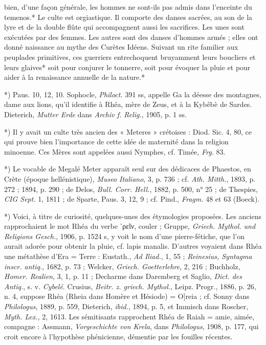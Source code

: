 \documentclass[a4paper, 11pt, oneside, polutonikogreek, french]{article}
\begin{document}
bien, d'une façon générale, les hommes ne sont-ils pas admis dans l'enceinte du temenos.* Le culte est orgiastique. Il comporte des danses sacrées, au son de la lyre et de la double flûte qui accompagnent aussi les sacrifices. Les unes sont exécutées par des femmes. Les autres sont des danses d'hommes armés ; elles ont donné naissance au mythe des Curètes Idéens. Suivant un rite familier aux peuplades primitives, ces guerriers entrechoquent bruyamment leurs boucliers et leurs glaives* soit pour conjurer le tonnerre, soit pour évoquer la pluie et pour aider à la renaissance annuelle de la nature.*

*) Paus. 10, 12, 10. Sophocle, \emph{Philoct.} 391 ss, appelle Ga la déesse des montagnes, dame aux lions, qu'il identifie à Rhéa, mère de Zeus, et à la Kybêbè de Sardes. Dieterich, \emph{Mutter Erde} dans \emph{Archiv f. Relig.}, 1905, p. 1 ss.

*) Il y avait un culte très ancien des « Meteres » crétoises : Diod. Sic. 4, 80, ce qui prouve bien l'importance de cette idée de maternité dans la religion minoenne. Ces Mères sont appelées aussi Nymphes, cf. Timée, \emph{Frg.} 83.

*) Le vocable de Megalé Meter apparaît seul sur des dédicaces de Phaestos, en Crète (époque hellénistique), \emph{Museo Italiano}, 3, p. 736 ; cf. \emph{Ath. Mitth.}, 1893, p. 272 ; 1894, p. 290 ; de Delos, \emph{Bull. Corr. Hell.}, 1882, p. 500, n° 25 ; de Thespies, \emph{CIG Sept.} 1, 1811 ; de Sparte, Paus. 3, 12, 9 ; cf. Pind., \emph{Fragm.} 48 et 63 (Boeck).

*) Voici, à titre de curiosité, quelques-unes des étymologies proposées. Les anciens rapprochaient le mot Rhéa du verbe ῾ρεῖν, couler ; Gruppe, \emph{Griech. Mythol. und Religions Gesch.}, 1906, p. 1524 s, y voit le nom d'une pierre-fétiche, que l'on aurait adorée pour obtenir la pluie, cf. lapis manalis. D'autres voyaient dans Rhéa une métathèse d'Era = Terre : Eustath., \emph{Ad Iliad.}, 1, 55 ; \emph{Reinesius, Syntagma inscr. antiq.}, 1682, p. 73 ; Welcker, \emph{Griech. Goetterlehre}, 2, 216 ; Buchholz, \emph{Homer. Realien}, 3, 1, p. 11 ; Decharme dans Daremberg et Saglio, \emph{Dict. des Antiq.}, s. v. \emph{Cybelé}. Crusius, \emph{Beitr. z. griech. Mythol.}, Leipz. Progr., 1886, p. 26, n. 4, suppose Rhéa (Rheia dans Homère et Hésiode) = O]reia ; cf. Sonny dans \emph{Philologus}, 1889, p. 559, Dieterich, \emph{ibid.}, 1894, p. 5, et Immisch dans Roscher, \emph{Myth. Lex.}, 2, 1613. Les sémitisants rapprochent Rhéa de Raiah = amie, aimée, compagne : Assmann, \emph{Vorgeschichte von Krela}, dans \emph{Philologus}, 1908, p. 177, qui croit encore à l'hypothèse phénicienne, démentie par les fouilles récentes.
\end{document}
